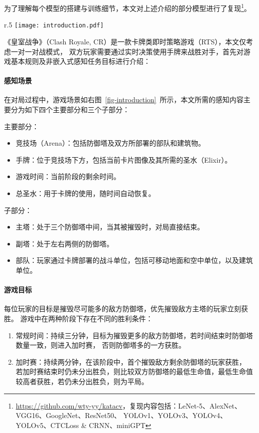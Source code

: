 为了理解每个模型的搭建与训练细节，本文对上述介绍的部分模型进行了复现\footnote{\url{https://github.com/wty-yy/katacv}，复现内容包括：LeNet-5、AlexNet、VGG16、GoogleNet、ResNet50、
YOLOv1、YOLOv3、YOLOv4、YOLOv5、CTCLoss \& CRNN、miniGPT}。

\begin{wrapfigure}[26]{r}{.5\textwidth} %
  \vspace{-4ex}\centering
  \texttt{[image: introduction.pdf]}
  \caption{右上角为当前阶段的剩余时间；中间为竞技场部分，双方可在其上部署部队及建筑；
  下方显示了可用手牌以及部署所需的圣水，最下方显示了当前的可用圣水总量。}
  \label{fig-introduction}
\end{wrapfigure}
《皇室战争》（Clash Royale, CR）是一款卡牌类即时策略游戏（RTS），本文仅考虑一对一对战模式，
双方玩家需要通过实时决策使用手牌来战胜对手，首先对游戏基本规则及非嵌入式感知任务目标进行介绍：
\paragraph*{感知场景}在对局过程中，游戏场景如右图~\ref{fig-introduction}~所示，本文所需的感知内容主要分为如下四个主要部分和三个子部分：

\noindent 主要部分：
\begin{itemize}[left=1em]
  \item 竞技场（Arena）：包括防御塔及双方所部署的部队和建筑物。
  \item 手牌：位于竞技场下方，包括当前卡片图像及其所需的圣水（Elixir）。
  \item 游戏时间：当前阶段的剩余时间。
  \item 总圣水：用于卡牌的使用，随时间自动恢复。
\end{itemize}

\noindent 子部分：
\begin{itemize}[left=1em]
  \item 主塔：处于三个防御塔中间，当其被摧毁时，对局直接结束。
  \item 副塔：处于左右两侧的防御塔。
  \item 部队：玩家通过卡牌部署的战斗单位，包括可移动地面和空中单位，以及建筑单位。
\end{itemize}

\paragraph*{游戏目标}每位玩家的目标是摧毁尽可能多的敌方防御塔，优先摧毁敌方主塔的玩家立刻获胜。
游戏中在两种阶段下存在不同的胜利条件：\label{game-target}
\begin{enumerate}
  \item 常规时间：持续三分钟，目标为摧毁更多的敌方防御塔，若时间结束时防御塔数量一致，则进入加时赛，
  否则防御塔多的一方获胜。
  \item 加时赛：持续两分钟，在该阶段中，首个摧毁敌方剩余防御塔的玩家获胜，
  若加时赛结束时仍未分出胜负，则比较双方防御塔的最低生命值，最低生命值较高者获胜，若仍未分出胜负，则为平局。
\end{enumerate}
